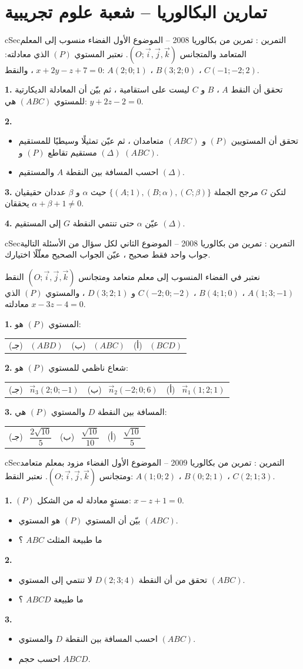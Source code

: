 \documentclass[12pt,a4paper]{article}
\newenvironment{BOX}[2]{\begin{otherlanguage}{english}\begin{arbox}{#1}{#2}}{\end{arbox}\end{otherlanguage}}
\newcounter{exo}
\newenvironment{tamrin}[1]{\stepcounter{exo}\begin{BOX}{cSec}{التمرين \theexo: #1}}{\end{BOX}}
\newenvironment{sq}{\begin{itemize}[leftmargin=2.4em,itemsep=3pt]}{\end{itemize}}
\newcommand{\qa}{\item[(أ)]}\newcommand{\qb}{\item[(ب)]}\newcommand{\qc}{\item[(جـ)]}\newcommand{\qd}{\item[(د)]}\newcommand{\qe}{\item[(هـ)]}
\newcommand{\QQ}[1]{\par\smallskip\textbf{#1.} }
\newcommand{\ABC}[3]{\\[2pt]\begin{tabular}{p{0.28\textwidth}p{0.28\textwidth}p{0.28\textwidth}}(جـ) \ #3 & (ب) \ #2 & (أ) \ #1\end{tabular}}
\newcommand{\Rep}{(O;\vec i,\vec j,\vec k)}
\begin{document}
\section{تمارين البكالوريا -- شعبة علوم تجريبية}
\begin{tamrin}{تمرين من بكالوريا 2008 -- الموضوع الأول}
الفضاء منسوب إلى المعلم المتعامد والمتجانس $\Rep$. نعتبر المستوي $(P)$ الذي معادلته: $x+2y-z+7=0$ ، والنقط: $A(2;0;1)$ ، $B(3;2;0)$ ، $C(-1;-2;2)$.
\QQ{1} تحقق أن النقط $A$ ، $B$ و $C$ ليست على استقامية ، ثم بيّن أن المعادلة الديكارتية للمستوي $(ABC)$ هي: $y+2z-2=0$.
\QQ{2}
\begin{sq}
\qa تحقق أن المستويين $(P)$ و $(ABC)$ متعامدان ، ثم عيّن تمثيلًا وسيطيًا للمستقيم $(\Delta)$ مستقيم تقاطع $(P)$ و $(ABC)$.
\qb احسب المسافة بين النقطة $A$ والمستقيم $(\Delta)$.
\end{sq}
\QQ{3} لتكن $G$ مرجح الجملة $\{(A;1),(B;\alpha),(C;\beta)\}$ حيث $\alpha$ و $\beta$ عددان حقيقيان يحققان $\alpha+\beta+1\neq0$.
\QQ{4} عيّن $\alpha$ حتى تنتمي النقطة $G$ إلى المستقيم $(\Delta)$.
\end{tamrin}
\begin{tamrin}{تمرين من بكالوريا 2008 -- الموضوع الثاني}
لكل سؤال من الأسئلة التالية جواب واحد فقط صحيح ، عيّن الجواب الصحيح معلّلًا اختيارك.
\par نعتبر في الفضاء المنسوب إلى معلم متعامد ومتجانس $\Rep$ النقط $A(1;3;-1)$ ، $B(4;1;0)$ ، $C(-2;0;-2)$ و $D(3;2;1)$ ، والمستوي $(P)$ الذي معادلته $x-3z-4=0$.
\QQ{1} المستوي $(P)$ هو: \ABC{$(BCD)$}{$(ABC)$}{$(ABD)$}
\QQ{2} شعاع ناظمي للمستوي $(P)$ هو: \ABC{$\vec n_1(1;2;1)$}{$\vec n_2(-2;0;6)$}{$\vec n_3(2;0;-1)$}
\QQ{3} المسافة بين النقطة $D$ والمستوي $(P)$ هي: \ABC{$\dfrac{\sqrt{10}}5$}{$\dfrac{\sqrt{10}}{10}$}{$\dfrac{2\sqrt{10}}5$}
\end{tamrin}
\begin{tamrin}{تمرين من بكالوريا 2009 -- الموضوع الأول}
الفضاء مزود بمعلم متعامد ومتجانس $\Rep$. نعتبر النقط: $A(1;0;2)$ ، $B(0;2;1)$ ، $C(2;1;3)$.
\QQ{1} $(P)$ مستوٍ معادلة له من الشكل: $x-z+1=0$.
\begin{sq}
\qa بيّن أن المستوي $(P)$ هو المستوي $(ABC)$.
\qb ما طبيعة المثلث $ABC$ ؟
\end{sq}
\QQ{2}
\begin{sq}
\qa تحقق من أن النقطة $D(2;3;4)$ لا تنتمي إلى المستوي $(ABC)$.
\qb ما طبيعة $ABCD$ ؟
\end{sq}
\QQ{3}
\begin{sq}
\qa احسب المسافة بين النقطة $D$ والمستوي $(ABC)$.
\qb احسب حجم $ABCD$.
\end{sq}
\end{tamrin}
\end{document}
